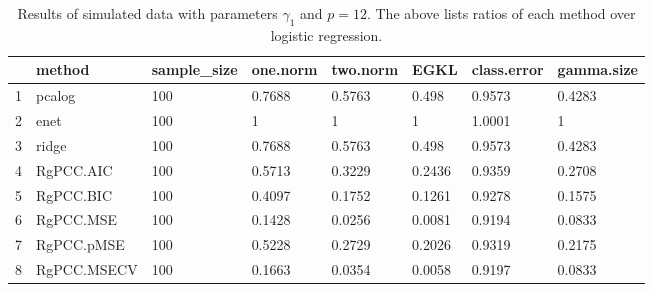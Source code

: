 \begin{table}[ht]
\centering
\begin{tabular}{rlllllll}
  \hline
 & method & sample\_size & one.norm & two.norm & EGKL & class.error & gamma.size \\ 
  \hline
1 & pcalog & 100 & 0.7688 & 0.5763 & 0.498 & 0.9573 & 0.4283 \\ 
  2 & enet & 100 & 1 & 1 & 1 & 1.0001 & 1 \\ 
  3 & ridge & 100 & 0.7688 & 0.5763 & 0.498 & 0.9573 & 0.4283 \\ 
  4 & RgPCC.AIC & 100 & 0.5713 & 0.3229 & 0.2436 & 0.9359 & 0.2708 \\ 
  5 & RgPCC.BIC & 100 & 0.4097 & 0.1752 & 0.1261 & 0.9278 & 0.1575 \\ 
  6 & RgPCC.MSE & 100 & 0.1428 & 0.0256 & 0.0081 & 0.9194 & 0.0833 \\ 
  7 & RgPCC.pMSE & 100 & 0.5228 & 0.2729 & 0.2026 & 0.9319 & 0.2175 \\ 
  8 & RgPCC.MSECV & 100 & 0.1663 & 0.0354 & 0.0058 & 0.9197 & 0.0833 \\ 
   \hline
\end{tabular}
\caption{Results of simulated data with parameters $\gamma_1$ and $p =12$. The above lists ratios of each method over logistic regression.} 
\label{fig-1-100-lead-12-metrics-pratio}
\end{table}
